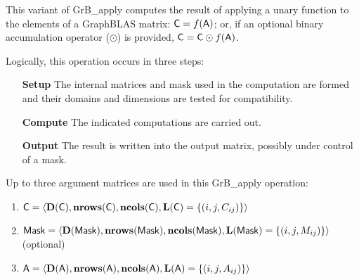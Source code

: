 This variant of {\sf GrB\_apply} computes the result of applying a unary function
to the elements of a 
GraphBLAS matrix: ${\sf C} = f({\sf A})$; or, if an 
optional binary accumulation operator ($\odot$) is provided, 
${\sf C} = {\sf C} \odot f({\sf A})$.  

Logically, this operation occurs in three steps:
\begin{enumerate}[leftmargin=0.75in]
\item[\bf Setup] The internal matrices and mask used in the computation are formed 
and their domains and dimensions are tested for compatibility.
\item[\bf Compute] The indicated computations are carried out.
\item[\bf Output] The result is written into the output matrix, possibly under 
control of a mask.
\end{enumerate}

Up to three argument matrices are used in this {\sf GrB\_apply} operation:
\begin{enumerate}
	\item ${\sf C} = \langle \bold{D}({\sf C}),\bold{nrows}({\sf C}),
    \bold{ncols}({\sf C}),\bold{L}({\sf C}) = \{(i,j,C_{ij}) \} \rangle$
    
	\item ${\sf Mask} = \langle \bold{D}({\sf Mask}),\bold{nrows}({\sf Mask}),
    \bold{ncols}({\sf Mask}),\bold{L}({\sf Mask}) = \{(i,j,M_{ij}) \} \rangle$ (optional)

	\item ${\sf A} = \langle \bold{D}({\sf A}),\bold{nrows}({\sf A}),
    \bold{ncols}({\sf A}),\bold{L}({\sf A}) = \{(i,j,A_{ij}) \} \rangle$
\end{enumerate}


